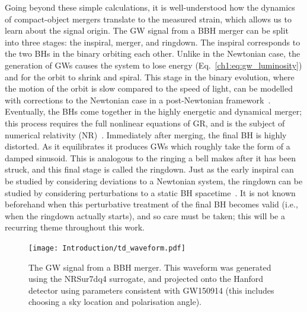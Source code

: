 Going beyond these simple calculations, it is well-understood how the dynamics of compact-object mergers translate to the measured strain, which allows us to learn about the signal origin.
The GW signal from a BBH merger can be split into three stages: the inspiral, merger, and ringdown.
The inspiral corresponds to the two BHs in the binary orbiting each other. 
Unlike in the Newtonian case, the generation of GWs causes the system to lose energy (Eq.~\ref{ch1:eq:gw_luminosity}) and for the orbit to shrink and spiral. 
This stage in the binary evolution, where the motion of the orbit is slow compared to the speed of light, can be modelled with corrections to the Newtonian case in a post-Newtonian framework~\cite{Blanchet:2013haa}. 
Eventually, the BHs come together in the highly energetic and dynamical merger; this process requires the full nonlinear equations of GR, and is the subject of numerical relativity (NR)~\cite{Duez:2018jaf}. 
Immediately after merging, the final BH is highly distorted. 
As it equilibrates it produces GWs which roughly take the form of a damped sinusoid. 
This is analogous to the ringing a bell makes after it has been struck, and this final stage is called the ringdown.
Just as the early inspiral can be studied by considering deviations to a Newtonian system, the ringdown can be studied by considering perturbations to a static BH spacetime~\cite{Sasaki:2003xr, Pound:2021qin}. 
It is not known beforehand when this perturbative treatment of the final BH becomes valid (i.e., when the ringdown actually starts), and so care must be taken; this will be a recurring theme throughout this work.

\begin{figure}
    \centering
    \texttt{[image: Introduction/td\_waveform.pdf]}
    \caption[The time-domain gravitational-wave signal from a binary black-hole merger]{ 
    The GW signal from a BBH merger. 
    This waveform was generated using the NRSur7dq4 surrogate, and projected onto the Hanford detector using parameters consistent with GW150914 (this includes choosing a sky location and polarisation angle).
    }
    \label{ch1:fig:td_waveform}
\end{figure}

